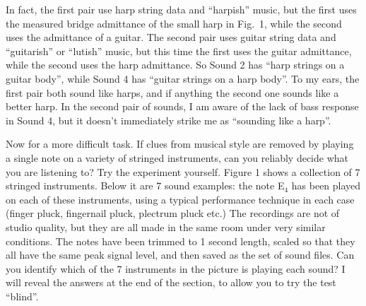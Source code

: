 
  In fact, the first pair use harp string data and ``harpish'' music, but the 
  first uses the measured bridge admittance of the small harp in Fig.\ 1, while 
  the second uses the admittance of a guitar. The second pair uses guitar 
  string data and ``guitarish'' or ``lutish'' music, but this time the first 
  uses the guitar admittance, while the second uses the harp admittance. So 
  Sound 2 has ``harp strings on a guitar body'', while Sound 4 has ``guitar 
  strings on a harp body''. To my ears, the first pair both sound like harps, 
  and if anything the second one sounds like a better harp. In the second pair 
  of sounds, I am aware of the lack of bass response in Sound 4, but it doesn't 
  immediately strike me as ``sounding like a harp''. 

  Now for a more difficult task. If clues from musical style are removed by 
  playing a single note on a variety of stringed instruments, can you reliably 
  decide what you are listening to? Try the experiment yourself. Figure 1 shows 
  a collection of 7 stringed instruments. Below it are 7 sound examples: the 
  note E$_4$ has been played on each of these instruments, using a typical 
  performance technique in each case (finger pluck, fingernail pluck, plectrum 
  pluck etc.) The recordings are not of studio quality, but they are all made 
  in the same room under very similar conditions. The notes have been trimmed 
  to 1 second length, scaled so that they all have the same peak signal level, 
  and then saved as the set of sound files. Can you identify which of the 7 
  instruments in the picture is playing each sound? I will reveal the answers 
  at the end of the section, to allow you to try the test ``blind''. 








